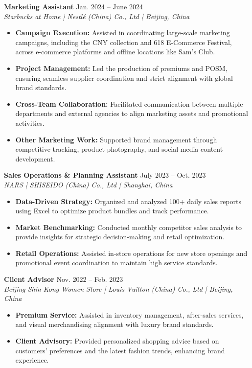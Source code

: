 \documentclass[a4paper,10pt]{article}
\begin{document}
\vspace{6pt}
\textbf{Marketing Assistant} \hfill Jan. 2024 -- June 2024\\
\textit{Starbucks at Home | Nestl\'{e} (China) Co., Ltd | Beijing, China}
\begin{itemize}[noitemsep]
  \item \textbf{Campaign Execution:} Assisted in coordinating large-scale marketing campaigns, including the CNY collection and 618 E-Commerce Festival, across e-commerce platforms and offline locations like Sam's Club.
  \item \textbf{Project Management:} Led the production of premiums and POSM, ensuring seamless supplier coordination and strict alignment with global brand standards.
  \item \textbf{Cross-Team Collaboration:} Facilitated communication between multiple departments and external agencies to align marketing assets and promotional activities.
  \item \textbf{Other Marketing Work:} Supported brand management through competitive tracking, product photography, and social media content development.
\end{itemize}

\vspace{6pt}
\textbf{Sales Operations \& Planning Assistant} \hfill July 2023 -- Oct. 2023\\
\textit{NARS | SHISEIDO (China) Co., Ltd | Shanghai, China}
\begin{itemize}[noitemsep]
  \item \textbf{Data-Driven Strategy:} Organized and analyzed 100+ daily sales reports using Excel to optimize product bundles and track performance.
  \item \textbf{Market Benchmarking:} Conducted monthly competitor sales analysis to provide insights for strategic decision-making and retail optimization.
  \item \textbf{Retail Operations:} Assisted in-store operations for new store openings and promotional event coordination to maintain high service standards.
\end{itemize}

\vspace{6pt}
\textbf{Client Advisor} \hfill Nov. 2022 -- Feb. 2023\\
\textit{Beijing Shin Kong Women Store | Louis Vuitton (China) Co., Ltd | Beijing, China}
\begin{itemize}[noitemsep]
  \item \textbf{Premium Service:} Assisted in inventory management, after-sales services, and visual merchandising alignment with luxury brand standards.
  \item \textbf{Client Advisory:} Provided personalized shopping advice based on customers' preferences and the latest fashion trends, enhancing brand experience.
\end{itemize}
\end{document}
